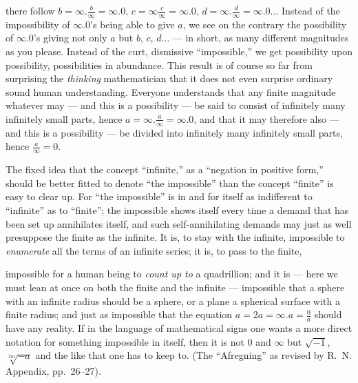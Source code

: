\documentclass[12pt,a4paper]{book}
\begin{document}
there follow $b = \infty.\frac{b}{\infty} = \infty.0$,
$c = \infty \frac{c}{\infty} = \infty.0$,
$d = \infty.\frac{d}{\infty} = \infty.0\ldots$
Instead of the impossibility of $\infty.0$'s being able to give $a$, we see on
the contrary the possibility of $\infty.0$'s giving not only $a$ but $b$, $c$,
$d\ldots$ --- in short, as many different magnitudes as you please. Instead of
the curt, dismissive ``impossible,'' we get possibility upon possibility,
possibilities in abundance. This result is of course so far from surprising the
\emph{thinking} mathematician that it does not even surprise ordinary sound
human understanding. Everyone understands that any finite magnitude whatever
may --- and this is a possibility --- be said to consist of infinitely many
infinitely small parts, hence $a = \infty.\frac{a}{\infty} = \infty.0$, and
that it may therefore also --- and this is a possibility --- be divided into
infinitely many infinitely small parts, hence $\frac{a}{\infty} = 0$.

The fixed idea that the concept ``infinite,'' as a ``negation in positive
form,'' should be better fitted to denote ``the impossible'' than the concept
``finite'' is easy to clear up. For ``the impossible'' is in and for itself as
indifferent to ``infinite'' as to ``finite''; the impossible shows itself every
time a demand that has been set up annihilates itself, and such
self-annihilating demands may just as well presuppose the finite as the
infinite. It is, to stay with the infinite, impossible to \emph{enumerate} all
the terms of an infinite series; it is, to pass to the finite,

impossible for a human being to \emph{count up to} a quadrillion; and it is ---
here we must lean at once on both the finite and the infinite --- impossible
that a sphere with an infinite radius should be a sphere, or a plane a
spherical surface with a finite radius; and just as impossible that the
equation $a = 2a = \infty.a = \frac{0}{a}$ should have any reality. If in the
language of mathematical signs one wants a more direct notation for something
impossible in itself, then it is not $0$ and $\infty$ but $\sqrt{-1}$,
$\sqrt[2m]{-a}$ and the like that one has to keep to. (The ``Afregning'' as
revised by R.~N. Appendix, pp.~26--27).
\end{document}
